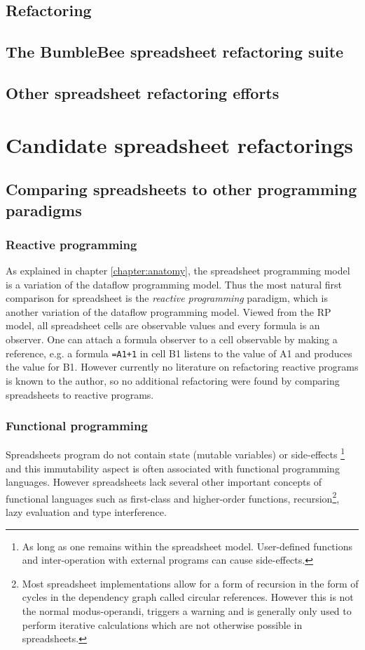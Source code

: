 \documentclass[12pt,a4paper,onecolumn,oneside]{memoir}
\newcommand{\f}[1]{\texttt{#1}}
\begin{document}
\section{Refactoring}

\section{The BumbleBee spreadsheet refactoring suite}

\section{Other spreadsheet refactoring efforts}


\chapter{Candidate spreadsheet refactorings}

\section{Comparing spreadsheets to other programming paradigms}

\subsection{Reactive programming}
As explained in chapter \ref{chapter:anatomy}, the spreadsheet programming model is a variation of the dataflow programming model.
Thus the most natural first comparison for spreadsheet is the \emph{reactive programming} paradigm, which is another variation of the dataflow programming model.
Viewed from the RP model, all spreadsheet cells are observable values and every formula is an observer.
One can attach a formula observer to a cell observable by making a reference, e.g. a formula \f{=A1+1} in cell B1 listens to the value of A1 and produces the value for B1.
However currently no literature on refactoring reactive programs is known to the author, so no additional refactoring were found by comparing spreadsheets to reactive programs.

\subsection{Functional programming}
Spreadsheets program do not contain state (mutable variables) or side-effects
\footnote{As long as one remains within the spreadsheet model. User-defined functions and inter-operation with external programs can cause side-effects.}
and this immutability aspect is often associated with functional programming languages.
However spreadsheets lack several other important concepts of functional languages such as first-class and higher-order functions, recursion\footnote{Most spreadsheet implementations allow for a form of recursion in the form of cycles in the dependency graph called circular references. However this is not the normal modus-operandi, triggers a warning and is generally only used to perform iterative calculations which are not otherwise possible in spreadsheets.}, lazy evaluation and type interference.
\end{document}
